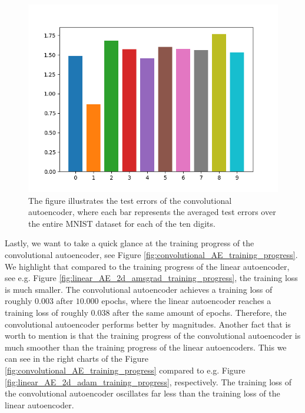 \begin{figure}
\begin{center}
      \includegraphics[width=0.49\linewidth]{convolutional_AE_errors}
\end{center}
\caption{The figure illustrates the test errors of the convolutional autoencoder, where each bar represents the averaged test errors over the entire MNIST dataset for each of the ten digits.}\label{fig:convolutional_AE_errors}
\end{figure}

Lastly, we want to take a quick glance at the training progress of the convolutional autoencoder, see Figure \ref{fig:convolutional_AE_training_progress}. We highlight that compared to the training progress of the linear autoencoder, see e.g. Figure \ref{fig:linear_AE_2d_amsgrad_training_progress}, the training loss is much smaller. The convolutional autoencoder achieves a training loss of roughly $0.003$ after $10.000$ epochs, where the linear autoencoder reaches a training loss of roughly $0.038$ after the same amount of epochs. Therefore, the convolutional autoencoder performs better by magnitudes. Another fact that is worth to mention is that the training progress of the convolutional autoencoder is much smoother than the training progress of the linear autoencoders. This we can see in the right charts of the Figure \ref{fig:convolutional_AE_training_progress} compared to e.g. Figure \ref{fig:linear_AE_2d_adam_training_progress}, respectively. The training loss of the convolutional autoencoder oscillates far less than the training loss of the linear autoencoder.

